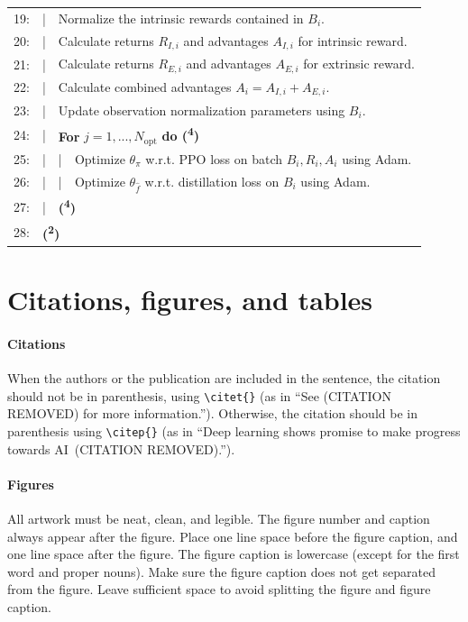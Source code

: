 \begin{table}[h!]
\begin{tabular}{rlll}
    19: & | & \multicolumn{2}{l}{Normalize the intrinsic rewards contained in $B_{i}$.}\\
    20: & | & \multicolumn{2}{l}{Calculate returns $R_{I,i}$ and advantages $A_{I,i}$ for intrinsic reward.}\\
    21: & | & \multicolumn{2}{l}{Calculate returns $R_{E,i}$ and advantages $A_{E,i}$ for extrinsic reward.}\\
    22: & | & \multicolumn{2}{l}{Calculate combined advantages $A_{i} = A_{I,i} + A_{E,i}$.}\\
    23: & | & \multicolumn{2}{l}{Update observation normalization parameters using $B_{i}$.}\\
    24: & | & \multicolumn{2}{l}{\textbf{For} $j = 1, ..., N_{\text{opt}}$ \textbf{do (\textsuperscript{4})}}\\
    25: & | & | & Optimize $\theta_{\pi}$ w.r.t. PPO loss on batch $B_{i}, R_{i}, A_{i}$ using Adam.\\
    26: & | & | & Optimize $\theta_{\hat{f}}$ w.r.t. distillation loss on $B_{i}$ using Adam.\\
    27: & | & \multicolumn{2}{l}{\textbf{(\textsuperscript{4})}}\\
    28: & \multicolumn{3}{l}{\textbf{(\textsuperscript{2})}}\\
    \hline\hline
  \end{tabular}
\end{table}

\section{Citations, figures, and tables}

\paragraph{Citations}

When the authors or the publication are
included in the sentence, the citation should not be in parenthesis, using \verb|\citet{}| (as
in ``See (CITATION REMOVED) for more information.''). Otherwise, the citation
should be in parenthesis using \verb|\citep{}| (as in ``Deep learning shows promise to make progress
towards AI~(CITATION REMOVED).'').

\paragraph{Figures}

All artwork must be neat, clean, and legible. The figure number and caption always appear after the figure. Place one line space before the figure caption, and one line space after the figure. The figure caption is lowercase (except for the first word and proper nouns). Make sure the figure caption does not get separated from the figure. Leave sufficient space to avoid splitting the figure and figure caption.

